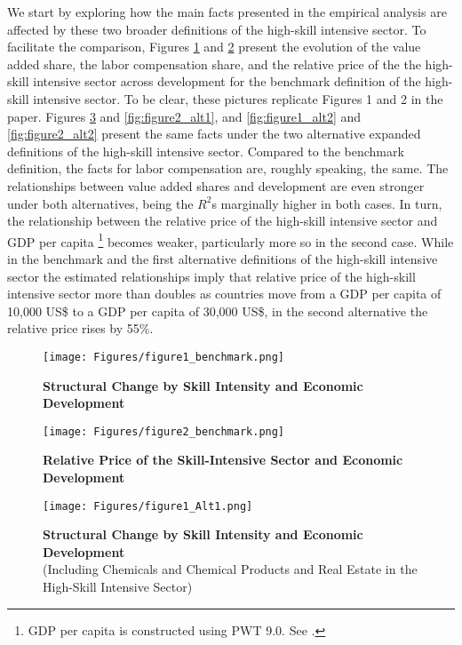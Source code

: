 \documentclass[10pt]{article}
\begin{document}
We start by exploring how the main facts presented in the empirical analysis are affected by these two broader definitions of the high-skill intensive sector. To facilitate the comparison, Figures \ref{fig:figure1} and \ref{fig:figure2} present the evolution of the value added share, the labor compensation share, and the relative price of the the high-skill intensive sector across development for the benchmark definition of the high-skill intensive sector. To be clear, these pictures replicate Figures 1 and 2 in the paper. Figures \ref{fig:figure1_alt1} and \ref{fig:figure2_alt1}, and \ref{fig:figure1_alt2} and \ref{fig:figure2_alt2} present the same facts under the two alternative expanded definitions of the high-skill intensive sector. Compared to the benchmark definition, the facts for labor compensation are, roughly speaking, the same. The relationships between value added shares and development are even stronger under both alternatives, being the $R^{2}$s marginally higher in both cases. In turn, the relationship between the relative price of the high-skill intensive sector and GDP per capita \footnote{GDP per capita is constructed using PWT 9.0. See \citet{FI_PWT90}.} becomes weaker, particularly more so in the second case. While in the benchmark and the first alternative definitions of the high-skill intensive sector the estimated relationships imply that relative price of the high-skill intensive sector more than doubles as countries move from a GDP per capita of 10,000 US\$ to a GDP per capita of 30,000 US\$, in the second alternative the relative price rises by 55\%.\\ 

\begin{figure}[!h] 
\caption{\centering \textbf{Structural Change by Skill Intensity and Economic Development}}
\centering
\texttt{[image: Figures/figure1\_benchmark.png]}
\label{fig:figure1}
\end{figure}

\begin{figure}[!h] 
\caption{\centering \textbf{Relative Price of the Skill-Intensive Sector and Economic Development}}
\centering
\texttt{[image: Figures/figure2\_benchmark.png]}
\label{fig:figure2}
\end{figure}

\begin{figure}[!h] 
\caption{\centering \textbf{Structural Change by Skill Intensity and Economic Development} \\ (Including Chemicals and Chemical Products and Real Estate in the High-Skill Intensive Sector)}
\centering
\texttt{[image: Figures/figure1\_Alt1.png]}
\label{fig:figure1_alt1}
\end{figure}
\end{document}
